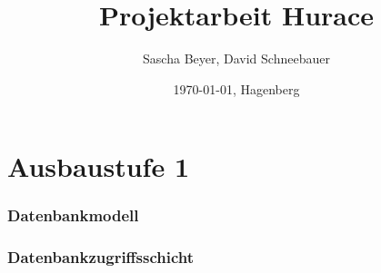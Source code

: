 \documentclass[a4paper, 12pt]{article}
\title{Projektarbeit Hurace}
\author{Sascha Beyer, David Schneebauer}
\date{\today{}, Hagenberg}
\begin{document}
	\maketitle
	\tableofcontents
	\newpage
	\section{Ausbaustufe 1}
	\subsubsection{Datenbankmodell}
	\begin{comment}
	
	\newpage
	
	\newpage
	
	\end{comment}
	\newpage
	\subsubsection{Datenbankzugriffsschicht}
	\begin{comment}
	\texttt{[image: img/main\_1.png]}
	\\
	\texttt{[image: img/main\_2.png]}
	\\
	\texttt{[image: img/main\_3.png]}
	\end{comment}
	\newpage	
\end{document}
